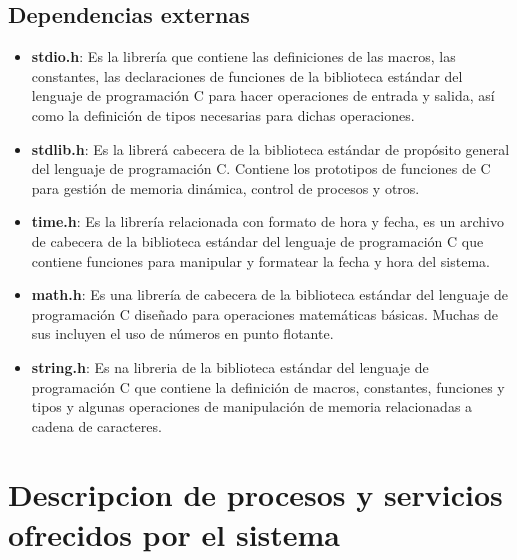\documentclass[12pt,twocolum,a4paper]{article}
\begin{document}
\subsection{Dependencias externas}
\begin{itemize}
    \item {\bf stdio.h}: Es la librer\'ia que contiene las definiciones de las macros, las constantes, las declaraciones de funciones de la biblioteca est\'andar del lenguaje de programaci\'on C para hacer operaciones de entrada y salida, as\'i como la definici\'on de tipos necesarias para dichas operaciones.
    \item {\bf stdlib.h}: Es la librer\'a cabecera de la biblioteca est\'andar de prop\'osito general del lenguaje de programaci\'on C. Contiene los prototipos de funciones de C para gesti\'on de memoria din\'amica, control de procesos y otros.
    \item {\bf time.h}: Es la librer\'ia relacionada con formato de hora y fecha, es un archivo de cabecera de la biblioteca est\'andar del lenguaje de programaci\'on C que contiene funciones para manipular y formatear la fecha y hora del sistema.
    \item {\bf math.h}: Es una librer\'ia de cabecera de la biblioteca est\'andar del lenguaje de programaci\'on C dise\~nado para operaciones matem\'aticas b\'asicas. Muchas de sus incluyen el uso de n\'umeros en punto flotante.
    \item {\bf string.h}: Es na libreria de la biblioteca est\'andar del lenguaje de programaci\'on C que contiene la definici\'on de macros, constantes, funciones y tipos y algunas operaciones de manipulaci\'on de memoria relacionadas a cadena de caracteres.
\end{itemize}

\section{Descripcion de procesos y servicios ofrecidos por el sistema}
\end{document}
